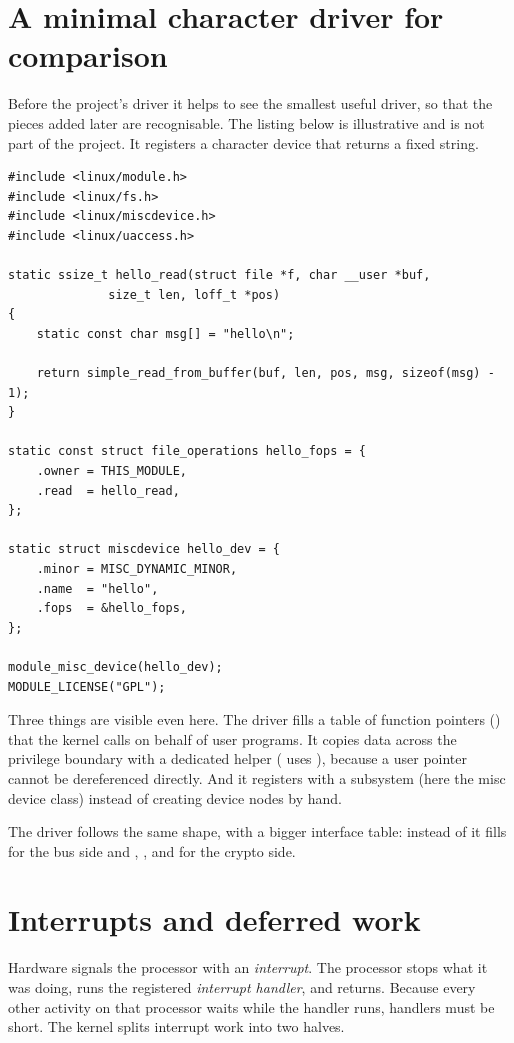 \section{A minimal character driver for comparison}\label{sec:minchar}

Before the project's driver it helps to see the smallest useful driver, so that the pieces added later are recognisable. The listing below is illustrative and is not part of the project. It registers a character device that returns a fixed string.

\begin{lstlisting}
#include <linux/module.h>
#include <linux/fs.h>
#include <linux/miscdevice.h>
#include <linux/uaccess.h>

static ssize_t hello_read(struct file *f, char __user *buf,
			  size_t len, loff_t *pos)
{
	static const char msg[] = "hello\n";

	return simple_read_from_buffer(buf, len, pos, msg, sizeof(msg) - 1);
}

static const struct file_operations hello_fops = {
	.owner = THIS_MODULE,
	.read  = hello_read,
};

static struct miscdevice hello_dev = {
	.minor = MISC_DYNAMIC_MINOR,
	.name  = "hello",
	.fops  = &hello_fops,
};

module_misc_device(hello_dev);
MODULE_LICENSE("GPL");
\end{lstlisting}

Three things are visible even here. The driver fills a table of function pointers () that the kernel calls on behalf of user programs. It copies data across the privilege boundary with a dedicated helper ( uses ), because a user pointer cannot be dereferenced directly. And it registers with a subsystem (here the misc device class) instead of creating device nodes by hand.

The \proj{} driver follows the same shape, with a bigger interface table: instead of  it fills  for the bus side and , ,  and  for the crypto side.

\section{Interrupts and deferred work}

Hardware signals the processor with an \emph{interrupt}. The processor stops what it was doing, runs the registered \emph{interrupt handler}, and returns. Because every other activity on that processor waits while the handler runs, handlers must be short. The kernel splits interrupt work into two halves.


